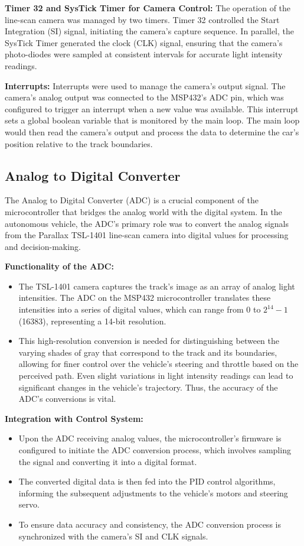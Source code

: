 \documentclass[conference]{IEEEtran}
\begin{document}
\textbf{Timer 32 and SysTick Timer for Camera Control:} The operation of the line-scan camera was managed by two timers. Timer 32 controlled the Start Integration (SI) signal, initiating the camera's capture sequence. In parallel, the SysTick Timer generated the clock (CLK) signal, ensuring that the camera's photo-diodes were sampled at consistent intervals for accurate light intensity readings.

\textbf{Interrupts:} Interrupts were used to manage the camera's output signal. The camera's analog output was connected to the MSP432's ADC pin, which was configured to trigger an interrupt when a new value was available. This interrupt sets a global boolean variable that is monitored by the main loop. The main loop would then read the camera's output and process the data to determine the car's position relative to the track boundaries.

\subsection{Analog to Digital Converter}

The Analog to Digital Converter (ADC) is a crucial component of the microcontroller that bridges the analog world with the digital system. In the autonomous vehicle, the ADC's primary role was to convert the analog signals from the Parallax TSL-1401 line-scan camera into digital values for processing and decision-making.

\textbf{Functionality of the ADC:}
\begin{itemize}
\item The TSL-1401 camera captures the track's image as an array of analog light intensities. The ADC on the MSP432 microcontroller translates these intensities into a series of digital values, which can range from 0 to $2^14 - 1$ (16383), representing a 14-bit resolution.
\item This high-resolution conversion is needed for distinguishing between the varying shades of gray that correspond to the track and its boundaries, allowing for finer control over the vehicle's steering and throttle based on the perceived path. Even slight variations in light intensity readings can lead to significant changes in the vehicle's trajectory. Thus, the accuracy of the ADC's conversions is vital.
\end{itemize}

\textbf{Integration with Control System:}
\begin{itemize}
\item Upon the ADC receiving analog values, the microcontroller's firmware is configured to initiate the ADC conversion process, which involves sampling the signal and converting it into a digital format.
\item The converted digital data is then fed into the PID control algorithms, informing the subsequent adjustments to the vehicle's motors and steering servo.
\item To ensure data accuracy and consistency, the ADC conversion process is synchronized with the camera's SI and CLK signals.
\end{itemize}
\end{document}
